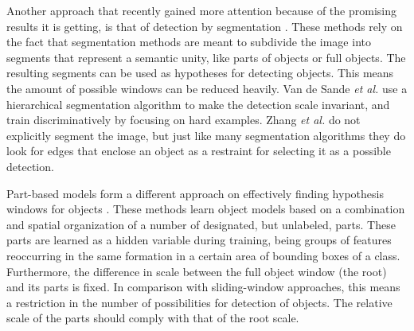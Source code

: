 Another approach that recently gained more attention because of the promising results it is getting, is that of detection by segmentation \cite{van2011segmentation, zhang2010free}. These methods rely on the fact that segmentation methods are meant to subdivide the image into segments that represent a semantic unity, like parts of objects or full objects. The resulting segments can be used as hypotheses for detecting objects. This means the amount of possible windows can be reduced heavily. Van de Sande \emph{et al.} \cite{van2011segmentation} use a hierarchical segmentation algorithm to make the detection scale invariant, and train discriminatively by focusing on hard examples. Zhang \emph{et al.} \cite{zhang2010free} do not explicitly segment the image, but just like many segmentation algorithms they do look for edges that enclose an object as a restraint for selecting it as a possible detection.

Part-based models form a different approach on effectively finding hypothesis windows for objects \cite{felzenszwalb2010object}. These methods learn object models based on a combination and spatial organization of a number of designated, but unlabeled, parts. These parts are learned as a hidden variable during training, being groups of features reoccurring in the same formation in a certain area of bounding boxes of a class. Furthermore, the difference in scale between the full object window (the root) and its parts is fixed. In comparison with sliding-window approaches, this means a restriction in the number of possibilities for detection of objects. The relative scale of the parts should comply with that of the root scale.


